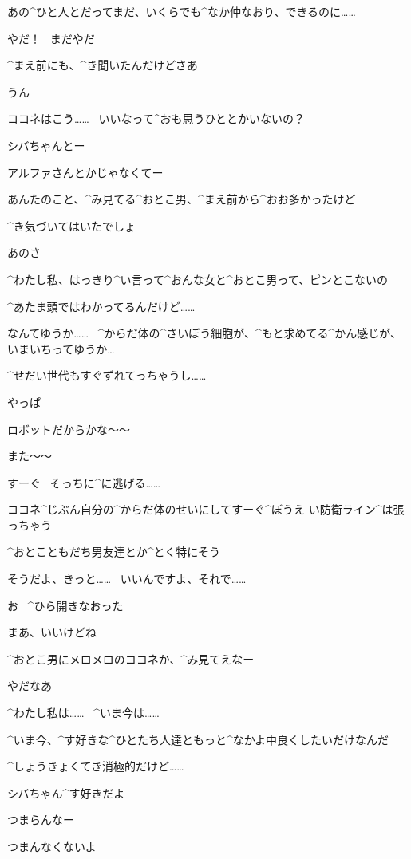 \K あの^{ひと}{人}とだってまだ、いくらでも^{なか}{仲}なおり、できるのに……

\SH やだ！
\ まだやだ

\page
\SH ^{まえ}{前}にも、^{き}{聞}いたんだけどさあ

\K うん

\SH ココネはこう……
\ いいなって^{おも}{思}うひととかいないの？

\K シバちゃんとー

\SH アルファさんとかじゃなくてー

\page
\SH あんたのこと、^{み}{見}てる^{おとこ}{男}、^{まえ}{前}から^{おお}{多}かったけど

\SH ^{き}{気}づいてはいたでしょ

\SH あのさ

\K ^{わたし}{私}、はっきり^{い}{言}って^{おんな}{女}と^{おとこ}{男}って、ピンとこないの

\K ^{あたま}{頭}ではわかってるんだけど……

\K なんてゆうか……
\ ^{からだ}{体}の^{さいぼう}{細胞}が、^{もと}{求}めてる^{かん}{感}じが、いまいちってゆうか…

\K ^{せだい}{世代}もすぐずれてっちゃうし……

\page
\K やっぱ

\K ロボットだからかな〜〜

\SH また〜〜

\SH すーぐ
\ そっちに^{に}{逃}げる……

\SH ココネ^{じぶん}{自分}の^{からだ}{体}のせいにしてすーぐ^{ぼうえ
  い}{防衛}ライン^{は}{張}っちゃう

\SH ^{おとこともだち}{男友達}とか^{とく}{特}にそう

\K そうだよ、きっと……
\ いいんですよ、それで……

\SH お
\ ^{ひら}{開}きなおった

\page
\SH まあ、いいけどね

\SH ^{おとこ}{男}にメロメロのココネか、^{み}{見}てえなー

\K やだなあ

\K ^{わたし}{私}は……
\ ^{いま}{今}は……

\K ^{いま}{今}、^{す}{好}きな^{ひとたち}{人達}ともっと^{なかよ}{中良}くしたいだけなんだ

\SH ^{しょうきょくてき}{消極的}だけど……

\page
\K シバちゃん^{す}{好}きだよ

\SH つまらんなー

\K つまんなくないよ

